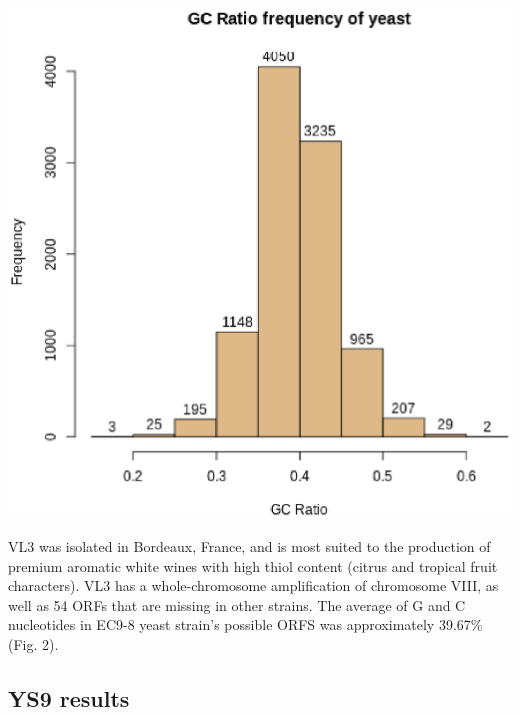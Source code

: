 \documentclass{article}
\begin{document}
\begin{minipage}{0.5\textwidth}
\includegraphics[width=\textwidth]{images/VL3_AWRI_2011_AEJS01000000.eps}
\end{minipage}
\begin{minipage}{0.5\textwidth}
VL3 was isolated in Bordeaux, France, and is most suited to the production of premium aromatic 
white wines with high thiol content (citrus and tropical fruit characters). 
VL3 has a whole-chromosome amplification of chromosome VIII, as well as 54 ORFs that are missing in other strains.
The average of G and C nucleotides in EC9-8 yeast strain's possible ORFS was approximately 39.67\%
(Fig. 2).  
\vspace{1cm}\\
\end{minipage}

\subsection{YS9 results}
\end{document}
